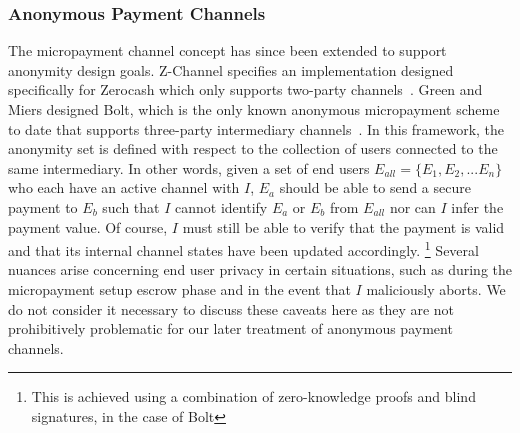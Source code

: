 \subsubsection{Anonymous Payment Channels} The micropayment channel concept has
since been extended to support anonymity design goals. Z-Channel specifies an
implementation designed specifically for Zerocash which only supports two-party
channels~\cite{zhang2017z}. Green and Miers designed Bolt, which is the only
known anonymous micropayment scheme to date that supports three-party
intermediary channels~\cite{green2017bolt}. In this framework, the anonymity set
is defined with respect to the collection of users connected to the same
intermediary. In other words, given a set of end users
$E_{all} = \{E_1, E_2, ... E_n\}$ who each have an active channel with $I$,
$E_a$ should be able to send a secure payment to $E_b$ such that $I$ cannot
identify $E_a$ or $E_b$ from $E_{all}$ nor can $I$ infer the payment value. Of
course, $I$ must still be able to verify that the payment is valid and that its
internal channel states have been updated accordingly.  \footnote{This is
  achieved using a combination of zero-knowledge proofs and blind signatures, in
  the case of Bolt} Several nuances arise concerning end user privacy in certain
situations, such as during the micropayment setup escrow phase and in the event
that $I$ maliciously aborts. We do not consider it necessary to discuss these
caveats here as they are not prohibitively problematic for our later treatment
of anonymous payment channels.

